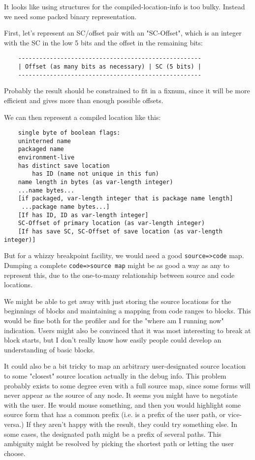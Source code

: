 It looks like using structures for the compiled-location-info is too bulky.
Instead we need some packed binary representation.

First, let's represent an SC/offset pair with an "SC-Offset", which is an
integer with the SC in the low 5 bits and the offset in the remaining bits:
\begin{verbatim}
    ----------------------------------------------------
    | Offset (as many bits as necessary) | SC (5 bits) |
    ----------------------------------------------------
\end{verbatim}
Probably the result should be constrained to fit in a fixnum, since it will be
more efficient and gives more than enough possible offsets.

We can then represent a compiled location like this:
\begin{verbatim}
    single byte of boolean flags:
	uninterned name
	packaged name
	environment-live
	has distinct save location
        has ID (name not unique in this fun)
    name length in bytes (as var-length integer)
    ...name bytes...
    [if packaged, var-length integer that is package name length]
     ...package name bytes...]
    [If has ID, ID as var-length integer]
    SC-Offset of primary location (as var-length integer)
    [If has save SC, SC-Offset of save location (as var-length integer)]
\end{verbatim}




But for a whizzy breakpoint facility, we would need a good \verb+source=>code+ map.
Dumping a complete \verb+code=>source map+ might be as good a way as any to represent
this, due to the one-to-many relationship between source and code locations.

We might be able to get away with just storing the source locations for the
beginnings of blocks and maintaining a mapping from code ranges to blocks.
This would be fine both for the profiler and for the "where am I running now"
indication.  Users might also be convinced that it was most interesting to
break at block starts, but I don't really know how easily people could develop
an understanding of basic blocks.

It could also be a bit tricky to map an arbitrary user-designated source
location to some "closest" source location actually in the debug info.
This problem probably exists to some degree even with a full source map, since
some forms will never appear as the source of any node.  It seems you might
have to negotiate with the user.  He would mouse something, and then you would
highlight some source form that has a common prefix (i.e. is a prefix of the
user path, or vice-versa.)  If they aren't happy with the result, they could
try something else.  In some cases, the designated path might be a prefix of
several paths.  This ambiguity might be resolved by picking the shortest path
or letting the user choose.

